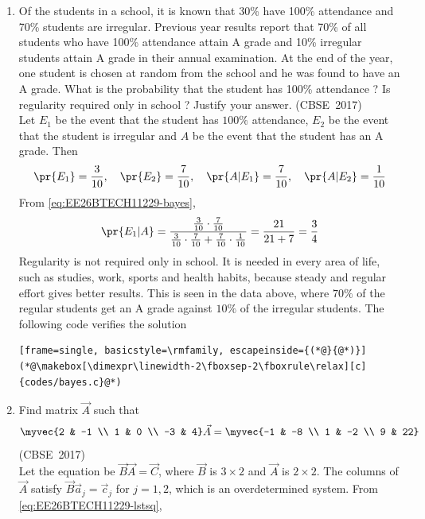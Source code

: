 \begin{enumerate}[label=\thesubsection.\arabic*, ref=\thesubsection.\theenumi]
\item 
Of the students in a school, it is known that 30\% have 100\% attendance and 70\% students are irregular. Previous year results report that 70\% of all students who have 100\% attendance attain A grade and 10\% irregular students attain A grade in their annual examination. At the end of the year, one student is chosen at random from the school and he was found to have an A grade. What is the probability that the student has 100\% attendance ? Is regularity required only in school ? Justify your answer.
\hfill (CBSE~2017)
\\
\solution
Let $E_1$ be the event that the student has $100\%$ attendance, $E_2$ be the event that the student is irregular and $A$ be the event that the student has an A grade. Then
\begin{align}
	\pr{E_1} = \frac{3}{10}, \quad \pr{E_2} = \frac{7}{10}, \quad \pr{A|E_1} = \frac{7}{10}, \quad \pr{A|E_2} = \frac{1}{10}
\end{align}
From \eqref{eq:EE26BTECH11229-bayes},
\begin{align}
	\pr{E_1|A} = \frac{\frac{3}{10}\cdot\frac{7}{10}}{\frac{3}{10}\cdot\frac{7}{10} + \frac{7}{10}\cdot\frac{1}{10}}
	= \frac{21}{21 + 7} = \frac{3}{4}
\end{align}
Regularity is not required only in school. It is needed in every area of life, such as studies, work, sports and health habits, because steady and regular effort gives better results. This is seen in the data above, where $70\%$ of the regular students get an A grade against $10\%$ of the irregular students.
The following code verifies the solution
\begin{lstlisting}[frame=single, basicstyle=\rmfamily, escapeinside={(*@}{@*)}]
(*@\makebox[\dimexpr\linewidth-2\fboxsep-2\fboxrule\relax][c]{codes/bayes.c}@*)
\end{lstlisting}
\item 
Find matrix $\vec{A}$ such that
\begin{align*}
	\myvec{2 & -1 \\ 1 & 0 \\ -3 & 4}\vec{A} = \myvec{-1 & -8 \\ 1 & -2 \\ 9 & 22}
\end{align*}
\hfill (CBSE~2017)
\\
\solution
Let the equation be $\vec{B}\vec{A} = \vec{C}$, where $\vec{B}$ is $3 \times 2$ and $\vec{A}$ is $2 \times 2$. The columns of $\vec{A}$ satisfy $\vec{B}\vec{a}_j = \vec{c}_j$ for $j = 1, 2$, which is an overdetermined system. From \eqref{eq:EE26BTECH11229-lstsq},

\end{enumerate}

